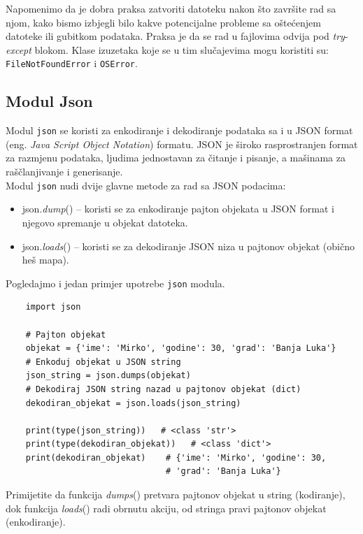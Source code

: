 Napomenimo da je dobra praksa zatvoriti datoteku nakon što zavr\-šite rad sa njom, kako bismo izbjegli bilo kakve potencijalne probleme sa oštećenjem datoteke ili gubitkom podataka. Praksa je da se rad u fajlovima odvija pod \textit{try}-\textit{except} blokom. Klase izuzetaka koje se u tim slučajevima mogu koristiti su: \texttt{FileNotFoundError} i \texttt{OSError}. 


\subsection{Modul Json}

Modul \texttt{json} se koristi  za enkodiranje i dekodiranje podataka sa i u JSON format (eng. \textit{Java Script Object Notation}) formatu. JSON je  široko raspro\-stranjen format za razmjenu podataka, ljudima jednostavan za čitanje i pisanje, a mašinama za raščlanjivanje i generisanje.\\

Modul \texttt{json} nudi dvije glavne metode za rad sa JSON podacima:


\begin{itemize}
	\item json.\textit{dump}() -- koristi se za enkodiranje pajton objekata u JSON format i njegovo spremanje u objekat  datoteka.
	\item json.\textit{loads}() -- koristi se za dekodiranje JSON niza u pajtonov objekat (obično heš mapa).
\end{itemize}

Pogledajmo i jedan primjer upotrebe \texttt{json} modula. 

\begin{verbatim}
	import json
	
	# Pajton objekat
	objekat = {'ime': 'Mirko', 'godine': 30, 'grad': 'Banja Luka'}
	# Enkoduj objekat u JSON string
	json_string = json.dumps(objekat)
	# Dekodiraj JSON string nazad u pajtonov objekat (dict)
	dekodiran_objekat = json.loads(json_string)
	
	print(type(json_string))   # <class 'str'>
	print(type(dekodiran_objekat))   # <class 'dict'>
	print(dekodiran_objekat)    # {'ime': 'Mirko', 'godine': 30,
		                        # 'grad': 'Banja Luka'}
\end{verbatim}


Primijetite da funkcija \textit{dumps}() pretvara pajtonov objekat u string (kodiranje), dok funkcija \textit{loads}() radi obrnutu akciju, od stringa pravi pajtonov objekat (enkodiranje). 

